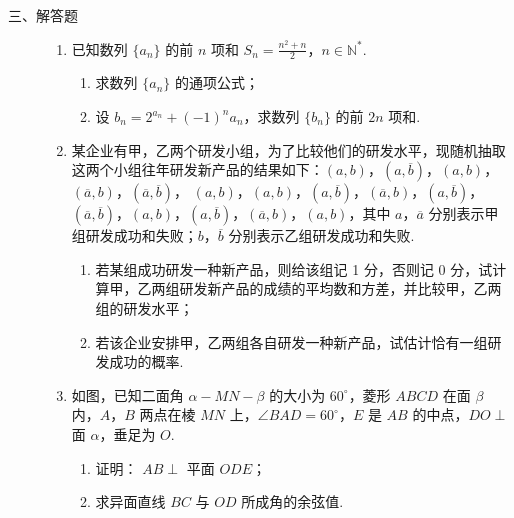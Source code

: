 \begin{description}

    \item[三、解答题]

    \begin{enumerate}[leftmargin=5pt]

      \addtocounter{enumi}{+15}

        \item 已知数列 \(\{a_{n}\}\) 的前 \(n\) 项和 \(S_{n} = \frac{n^{2} + n}{2}\)，\(n \in \mathbb{N}^{*}\).

\begin{enumerate}
\item 求数列 \( \{a_{n}\} \) 的通项公式；
\item 设 \( b_{n} = 2^{a_{n}} + (-1)^{n}a_{n} \)，求数列 \( \{b_{n}\} \) 的前 \( 2n \) 项和.
\end{enumerate}

        \item 某企业有甲，乙两个研发小组，为了比较他们的研发水平，现随机抽取这两个小组往年研发新产品的结果如下：\((a, b)\)，\((a, \overline{b})\)，\((a, b)\)，\((\overline{a}, b)\)，\((\overline{a}, \overline{b})\)，
\((a, b)\)，\((a, b)\)，\((a, \overline{b})\)，\((\overline{a}, b)\)，\((a, \overline{b})\)，
\((\overline{a}, \overline{b})\)，\((a, b)\)，\((a, \overline{b})\)，\((\overline{a}, b)\)，\((a, b)\)，其中 \(a\)，\(\overline{a}\) 分别表示甲组研发成功和失败；\(b\)，\(\overline{b}\) 分别表示乙组研发成功和失败.

\begin{enumerate}
\item 若某组成功研发一种新产品，则给该组记 1 分，否则记 0 分，试计算甲，乙两组研发新产品的成绩的平均数和方差，并比较甲，乙两组的研发水平；
\item 若该企业安排甲，乙两组各自研发一种新产品，试估计恰有一组研发成功的概率.
\end{enumerate}

        \item 如图，已知二面角 \(\alpha - MN - \beta\) 的大小为 \(60^{\circ}\)，菱形 \(ABCD\) 在面 \(\beta\) 内，\(A\)，\(B\) 两点在棱 \(MN\) 上，\(\angle BAD = 60^{\circ}\)，\(E\) 是 \(AB\) 的中点，\(DO \perp\) 面 \(\alpha\)，垂足为 \(O\).

\begin{enumerate}
\item 证明： \(AB \perp\) 平面 \(ODE\)；
\item 求异面直线 \(BC\) 与 \(OD\) 所成角的余弦值.
\end{enumerate}


\end{enumerate}
\end{description}
